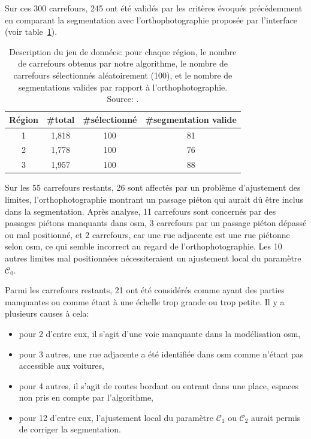 \newpar{}

Sur ces 300 carrefours, 245 ont été validés par les critères évoqués précédemment en comparant la segmentation avec l'orthophotographie proposée par l'interface (voir table~\ref{tab:nbRegions}).

\newpar{}

\begin{table}[ht]    
    \centering
    \footnotesize
    \begin{tabular}{c|c|c|c}
         Région & \#total & \#sélectionné & \#segmentation valide \\
         \hline
         1 & 1,818 & 100 & 81 \\
         2 & 1,778 & 100 & 76 \\
         3 & 1,957 & 100 & 88 \\
    \end{tabular}
    \caption[Description du jeu de données d'évaluation]{Description du jeu de données: pour chaque région, le nombre de carrefours obtenus par notre algorithme, le nombre de carrefours sélectionnés aléatoirement (100), et le nombre de segmentations valides par rapport à l'orthophotographie. Source: \citep{Favreau2022}.}
    \label{tab:nbRegions}
\end{table}


Sur les 55 carrefours restants, 26 sont affectés par un problème d'ajustement des limites, l'orthophotographie montrant un passage piéton qui aurait dû être inclus dans la segmentation.
Après analyse, 11 carrefours sont concernés par des passages piétons manquants dans \gls{osm}, 3 carrefours par un passage piéton dépassé ou mal positionné, et 2 carrefours, car une rue adjacente est une rue piétonne selon \gls{osm}, ce qui semble incorrect au regard de l'orthophotographie. Les 10 autres limites mal positionnées nécessiteraient un ajustement local du paramètre $\mathcal{C}_0$.

\newpage

Parmi les carrefours restants, 21 ont été considérés comme ayant des parties manquantes ou comme étant à une échelle trop grande ou trop petite. Il y a plusieurs causes à cela: 
\begin{itemize}
    \item pour 2 d'entre eux, il s'agit d'une voie manquante dans la modélisation \gls{osm}, 
    \item pour 3 autres, une rue adjacente a été identifiée dans \gls{osm} comme n'étant pas accessible aux voitures, 
    \item pour 4 autres, il s'agit de routes bordant ou entrant dans une place, espaces non pris en compte par l'algorithme,
    \item pour 12 d'entre eux, l'ajustement local du paramètre $\mathcal{C}_1$ ou $\mathcal{C}_2$ aurait permis de corriger la segmentation.
\end{itemize}

